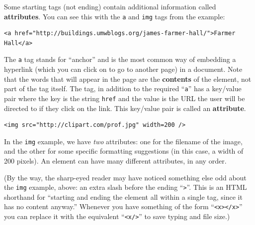 
Some starting tags (not ending) contain additional information called
\textbf{attributes}. You can see this with the \texttt{a} and \texttt{img}
tags from the example:

\vspace{-.15in}
\begin{Verbatim}[fontsize=\scriptsize,samepage=true,frame=lines]
<a href="http://buildings.umwblogs.org/james-farmer-hall/">Farmer Hall</a>
\end{Verbatim}
\vspace{-.15in}


The \texttt{a} tag stands for ``anchor'' and is the most common way of
embedding a hyperlink (which you can click on to go to another page) in a
document. Note that the words that will appear in the page are the
\textbf{contents} of the element, not part of the tag itself. The tag, in
addition to the required ``\texttt{a}'' has a key/value pair where the key is
the string \texttt{href} and the value is the URL the user will be directed to
if they click on the link. This key/value pair is called an
\textbf{attribute}.

\vspace{-.15in}
\begin{Verbatim}[fontsize=\footnotesize,samepage=true,frame=lines]
<img src="http://clipart.com/prof.jpg" width=200 />
\end{Verbatim}
\vspace{-.15in}

In the \texttt{img} example, we have \textit{two} attributes: one for the
filename of the image, and the other for some specific formatting suggestions
(in this case, a width of 200 pixels). An element can have many different
attributes, in any order.


(By the way, the sharp-eyed reader may have noticed something else odd about
the \texttt{img} example, above: an extra slash before the ending
``\texttt{>}''. This is an HTML shorthand for ``starting and ending the element
all within a single tag, since it has no content anyway.'' Whenever you have
something of the form ``\texttt{<x></x>}'' you can replace it with the
equivalent ``\texttt{<x/>}'' to save typing and file size.)

